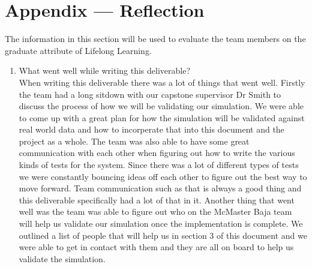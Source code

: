 \documentclass[12pt, titlepage]{article}
\begin{document}
\newpage{}
\section*{Appendix --- Reflection}

The information in this section will be used to evaluate the team members on the
graduate attribute of Lifelong Learning.



\begin{enumerate}
  \item What went well while writing this deliverable?\\ 
  When writing this deliverable there was a lot of things that went well.
  Firstly the team had a long sitdown with our capstone supervisor Dr Smith to discuss the process of how we will be validating our simulation.
  We were able to come up with a great plan for how the simulation will be validated against real world data and how to incorperate that into this document and the project as a whole.
  The team was also able to have some great communication with each other when figuring out how to write the various kinds of tests for the system.
  Since there was a lot of different types of tests we were constantly bouncing ideas off each other to figure out the best way to move forward.
  Team communication such as that is always a good thing and this deliverable specifically had a lot of that in it.
  Another thing that went well was the team was able to figure out who on the McMaster Baja team will help us validate our simulation once the implementation is complete.
  We outlined a list of people that will help us in section 3 of this document and we were able to get in contact with them and they are all on board to help us validate the simulation.  


\end{enumerate}
\end{document}
